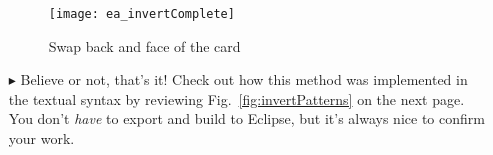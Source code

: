\begin{itemize}
\vspace{0.5cm}

\begin{figure}[htbp]
\begin{center}
  \texttt{[image: ea\_invertComplete]}
  \caption{Swap back and face of the card}  
  \label{fig:sdm_invertComplete}
\end{center}
\end{figure}

\vspace{0.5cm}

\item[$\blacktriangleright$] Believe or not, that's it! Check out how this method was implemented in the textual syntax by reviewing
Fig.~\ref{fig:invertPatterns} on the next page. You don't \emph{have} to export and build to Eclipse, but it's always nice to confirm your work.


\end{itemize}
